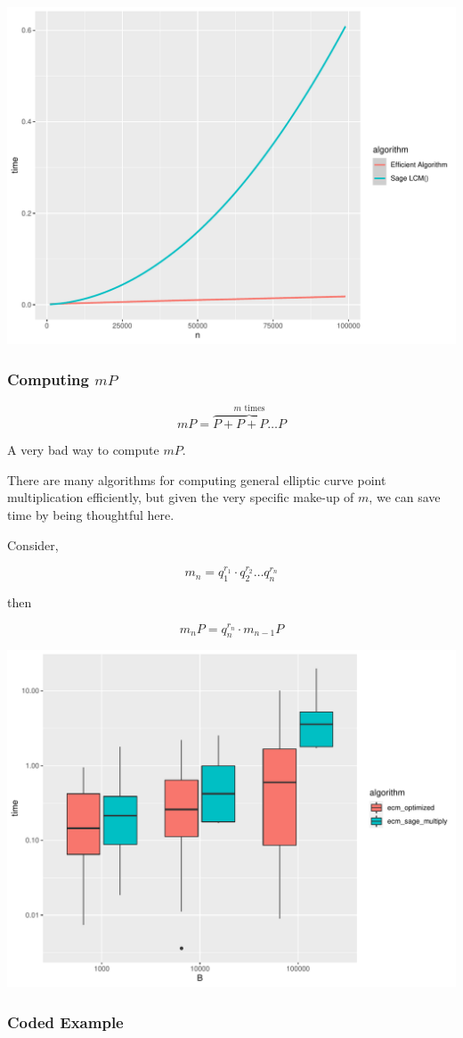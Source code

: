 \documentclass{beamer}
\begin{document}
\begin{frame}

\includegraphics[width=\textwidth]{graphs/lcm_comparison.pdf}

\end{frame}

\begin{frame}
\frametitle{Computing $mP$}

\[ mP = \overbrace{P + P + P \ldots P}^\text{$m$ times} \]
\begin{center}
    A very bad way to compute $mP$.
\end{center}

There are many algorithms for computing general elliptic curve point multiplication efficiently, but given the very specific make-up of $m$, we can save time by being thoughtful here.

Consider,

\[ m_n = q_1^{r_1} \cdot q_2^{r_2} \ldots q_n^{r_n} \]

then

\[ m_nP = q_n^{r_n} \cdot m_{n-1}P \]

\end{frame}

\begin{frame}

\includegraphics[width=\textwidth]{graphs/ecm_perf.pdf}

\end{frame}

\begin{frame}
\frametitle{Coded Example}



\end{frame}
\end{document}

